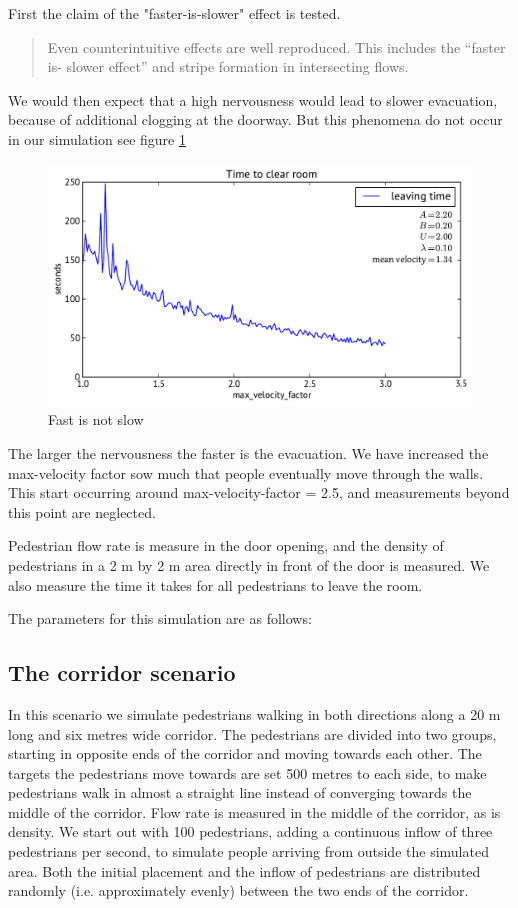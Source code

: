 First the claim of the "faster-is-slower" effect is tested.
\begin{quote}
Even counterintuitive
effects are well reproduced. This includes the “faster is-
slower effect” and stripe formation in intersecting flows. \cite{self-org}
\end{quote}
We would then expect that a high nervousness would lead to slower evacuation, because of additional clogging at the doorway. But this phenomena do not occur in our simulation see figure \ref{FastIsSlow}
\begin{figure}
\centering
\includegraphics[scale=0.5]{Figures/fastIsSlowNot}
\caption{Fast is not slow}
\label{FastIsSlow}
\end{figure}
The larger the nervousness the faster is the evacuation. We have increased the max-velocity factor sow much that people eventually move through the walls. This start occurring around max-velocity-factor = 2.5, and measurements beyond this point are neglected.

Pedestrian flow rate is measure in the door opening, and the density of pedestrians in a 2 m by 2 m area directly in front of the door is measured. We also measure the time it takes for all pedestrians to leave the room.

The parameters for this simulation are as follows:



\subsection{The corridor scenario}
In this scenario we simulate pedestrians walking in both directions along a 20 
m long and six metres wide corridor. The pedestrians are divided into two 
groups, starting in opposite ends of the corridor and moving towards each 
other. The targets the pedestrians move towards are set 500 metres to each 
side, to make pedestrians walk in almost a straight line instead of converging 
towards the middle of the corridor. Flow rate is measured in the middle of the 
corridor, as is density. We start out with 100 pedestrians, adding a 
continuous inflow of three pedestrians per second, to simulate people arriving 
from outside the simulated area. Both the initial placement and the inflow of 
pedestrians are distributed randomly (i.e. approximately evenly) between the 
two ends of the corridor.

